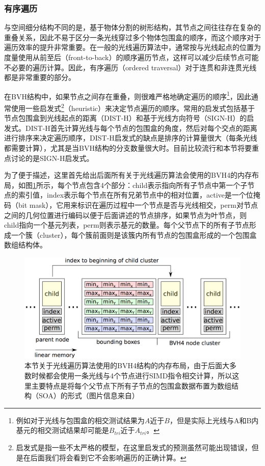 \subsubsection{有序遍历}
与空间细分结构不同的是，基于物体分割的树形结构，其节点之间往往存在复杂的重叠关系，因此不易于区分一条光线穿过多个物体包围盒的顺序，而这个顺序对于遍历效率的提升非常重要。在一般的光线遍历算法中，通常按与光线起点的位置为度量使用从前至后（front-to-back）的顺序遍历节点，这样可以减少后续节点可能不必要的遍历计算。因此，有序遍历（ordered traversal）对于连贯和非连贯光线都是非常重要的部分。

在BVH结构中，如果节点之间存在重叠，则很难严格地确定遍历的顺序\footnote{例如对于光线与包围盒的相交测试结果为$A$近于$B$，但是实际上光线与A和B内基元的相交测试结果却可能是$B_{tri}$近于$A_{tri}$。}，因此通常使用一些启发式\footnote{启发式是指一些不太严格的模型，在这里启发式的预测虽然可能出现错误，但是在后面我们将会看到它不会影响遍历的正确计算。}（heuristic）来决定节点遍历的顺序。常用的启发式包括基于节点包围盒到光线起点的距离（DIST-H）和基于光线方向符号（SIGN-H）的启发式。DIST-H首先计算光线与每个节点的包围盒的角度，然后对每个交点的距离进行排序来决定遍历顺序，DIST-H启发式的缺点是排序的计算量很大（每条光线都需要计算），尤其是当BVH结构的分支数量很大时。目前比较流行和本节将要重点讨论的是SIGN-H启发式。

为了便于描述，这里首先给出后面所有关于光线遍历算法会使用的BVH4的内存布局\cite{a:EfficientRayTracingKernelsforModernCPUArchitectures}，如图\ref{f:pt-bvh4}所示，每个节点包含4个部分：child表示指向所有子节点中第一个子节点的索引值，index表示每个节点在所有兄弟节点中的相对位置，active是一个位掩码（bit mask），它用来标识在遍历过程中一个节点是否与光线相交，perm对节点之间的几何位置进行编码以便于后面讲述的节点排序，如果节点为叶节点，则child指向一个基元列表，perm则表示基元的数量。每个父节点下的所有子节点形成一个簇（cluster），每个簇前面则是该簇内所有节点的包围盒形成的一个包围盒数组结构体。

\begin{figure}
	\includegraphics[width=1.\textwidth]{figures/pt/bvh4}
	\caption{本节关于光线遍历算法使用的BVH4结构的内存布局，由于后面大多数时候都会使用一条光线与4个节点进行SIMD指令相交计算，所以这里主要特点是将每个父节点下所有子节点的包围盒数据布置为数组结构（SOA）的形式（图片信息来自\cite{a:EfficientRayTracingKernelsforModernCPUArchitectures}）}
	\label{f:pt-bvh4}
\end{figure}

